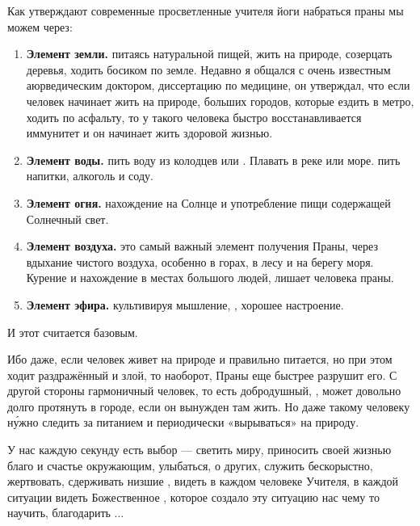 Как утверждают современные просветленные учителя йоги набраться праны мы можем через:
\begin{enumerate}
    \item \textbf{Элемент земли.} питаясь натуральной пищей, жить на природе, созерцать деревья, ходить босиком по земле. Недавно я общался с очень известным аюрведическим доктором,  диссертацию по медицине, он утверждал, что если человек начинает жить на природе,  больших городов, которые  ездить в метро, ходить по асфальту, то у такого человека быстро восстанавливается иммунитет и он начинает жить здоровой жизнью.

    \item \textbf{Элемент воды.} пить воду из колодцев или . Плавать в реке или море.  пить  напитки, алкоголь и соду.

    \item \textbf{Элемент огня.} нахождение на Солнце и употребление пищи содержащей Солнечный свет.

    \item  \textbf{Элемент воздуха.} это самый важный элемент получения Праны, через вдыхание чистого воздуха, особенно в горах, в лесу и на берегу моря. Курение и нахождение в местах большого  людей, лишает человека праны.

    \item \textbf{Элемент эфира.} культивируя  мышление, , хорошее настроение.
\end{enumerate}


И этот  считается базовым.

Ибо даже, если человек живет на природе и правильно питается, но при этом ходит раздражённый и злой, то наоборот,  Праны еще быстрее разрушит его.
С другой стороны гармоничный человек, то есть добродушный,
, может довольно долго протянуть в городе,
если он вынужден там жить.
Но даже такому человеку н\'{у}жно следить за питанием
и периодически «вырываться» на природу.

У нас каждую секунду есть выбор --- светить миру, приносить своей жизнью благо и счастье окружающим, улыбаться,  о других, служить бескорыстно, жертвовать, сдерживать низшие , видеть в каждом человеке Учителя, в каждой ситуации видеть Божественное , которое создало эту ситуацию  нас чему то научить, благодарить ...


